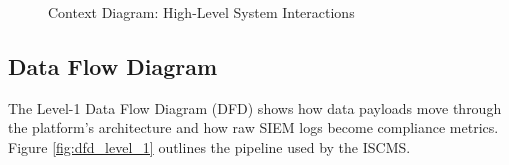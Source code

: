 \begin{figure}[H]
{
    }
    \caption{Context Diagram: High-Level System Interactions}
    \label{fig:context_diagram}
\end{figure}

\subsection{Data Flow Diagram}
The Level-1 Data Flow Diagram (DFD) shows how data payloads move through the platform's architecture and how raw SIEM logs become compliance metrics. Figure \ref{fig:dfd_level_1} outlines the pipeline used by the ISCMS.

